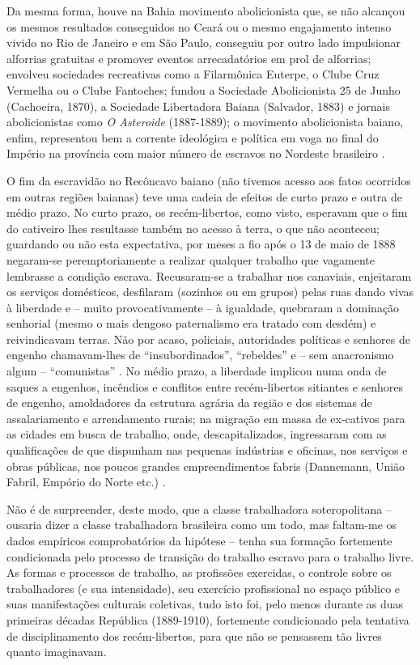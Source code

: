Da mesma forma, houve na Bahia movimento abolicionista que, se não alcançou os mesmos resultados conseguidos no Ceará ou o mesmo engajamento intenso vivido no Rio de Janeiro e em São Paulo, conseguiu por outro lado impulsionar alforrias gratuitas e promover eventos arrecadatórios em prol de alforrias; envolveu sociedades recreativas como a Filarmônica Euterpe, o Clube Cruz Vermelha ou o Clube Fantoches; fundou a Sociedade Abolicionista 25 de Junho (Cachoeira, 1870), a Sociedade Libertadora Baiana (Salvador, 1883) e jornais abolicionistas como \textit{O Asteroide} (1887-1889); o movimento abolicionista baiano, enfim, representou bem a corrente ideológica e política em voga no final do Império na província com maior número de escravos no Nordeste brasileiro \cite{brito2003abolicao}.

O fim da escravidão no Recôncavo baiano (não tivemos acesso aos fatos ocorridos em outras regiões baianas) teve uma cadeia de efeitos de curto prazo e outra de médio prazo. No curto prazo, os recém-libertos, como visto, esperavam que o fim do cativeiro lhes resultasse também no acesso à terra, o que não aconteceu; guardando ou não esta expectativa, por meses a fio após o 13 de maio de 1888 negaram-se peremptoriamente a realizar qualquer trabalho que vagamente lembrasse a condição escrava. Recusaram-se a trabalhar nos canaviais, enjeitaram os serviços domésticos, desfilaram (sozinhos ou em grupos) pelas ruas dando vivas à liberdade e -- muito provocativamente -- à igualdade, quebraram a dominação senhorial (mesmo o mais dengoso paternalismo era tratado com desdém) e reivindicavam terras. Não por acaso, policiais, autoridades políticas e senhores de engenho chamavam-lhes de ``insubordinados'', ``rebeldes'' e -- sem anacronismo algum -- ``comunistas'' \cite[p.~119-160]{fraga_encruzilhadas_2014}. No médio prazo, a liberdade implicou numa onda de saques a engenhos, incêndios e conflitos entre recém-libertos sitiantes e senhores de engenho, amoldadores da estrutura agrária da região e dos sistemas de assalariamento e arrendamento rurais; na migração em massa de ex-cativos para as cidades em busca de trabalho, onde, descapitalizados, ingressaram com as qualificações de que dispunham nas pequenas indústrias e oficinas, nos serviços e obras públicas, nos poucos grandes empreendimentos fabris (Dannemann, União Fabril, Empório do Norte etc.) \cite[p.~161-241]{fraga_encruzilhadas_2014}.

Não é de surpreender, deste modo, que a classe trabalhadora soteropolitana -- ousaria dizer a classe trabalhadora brasileira como um todo, mas faltam-me os dados empíricos comprobatórios da hipótese -- tenha sua formação fortemente condicionada pelo processo de transição do trabalho escravo para o trabalho livre. As formas e processos de trabalho, as profissões exercidas, o controle sobre os trabalhadores (e sua intensidade), seu exercício profissional no espaço público e suas manifestações culturais coletivas, tudo isto foi, pelo menos durante as duas primeiras décadas República (1889-1910), fortemente condicionado pela tentativa de disciplinamento dos recém-libertos, para que não se pensassem tão livres quanto imaginavam.

